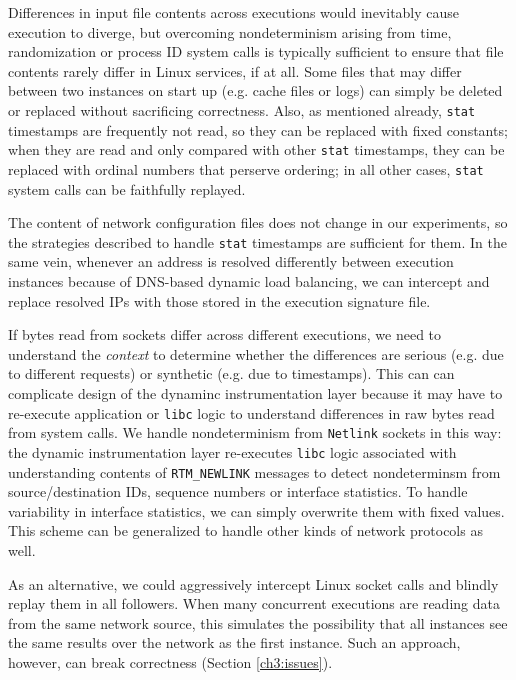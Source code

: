  \newline
Differences in input file contents across
executions would inevitably cause execution
to diverge, but overcoming nondeterminism arising
from time, randomization or process ID system calls
is typically sufficient to ensure that
file contents rarely differ in Linux services,
if at all. Some files that may differ
between two instances on start up (e.g. 
cache files or logs) can simply be 
deleted or replaced without sacrificing correctness.
Also, as mentioned already, \texttt{stat} 
timestamps are frequently not read, so
they can be replaced with fixed constants;
when they are read and only compared with other
\texttt{stat} timestamps, they can be replaced with 
ordinal numbers that perserve ordering;  
in all other cases, \texttt{stat} system calls 
can be faithfully replayed. \newline

 \newline
The content of network configuration files
does not change in our experiments, so the strategies 
described to handle \texttt{stat} timestamps 
are sufficient for them. In the same vein, whenever an address is resolved
differently between execution instances because of DNS-based dynamic load balancing, 
we can intercept and replace resolved IPs with those
stored in the execution signature file.

If bytes read from sockets differ across different executions,
we need to understand the {\em context} to determine whether the
differences are serious (e.g. due to different requests)
or synthetic (e.g. due to timestamps). This can
can complicate design of the dynaminc instrumentation
layer because it 
may have to re-execute application or \texttt{libc}
logic to understand differences in raw bytes read from system calls.
We handle nondeterminism from \texttt{Netlink}
sockets in this way: the dynamic instrumentation layer 
re-executes \texttt{libc} logic associated
with understanding contents of \texttt{RTM\_NEWLINK}
messages to detect nondeterminsm from source/destination 
IDs, sequence numbers or interface statistics.
To handle variability in interface statistics,
we can simply overwrite them with fixed values.
This scheme can be generalized to handle
other kinds of network protocols as well.

As an alternative, we could
aggressively intercept Linux socket calls
and blindly replay them in all followers.
When many concurrent executions are reading data from the
same network source, this simulates the possibility
that all instances see the same results over the network
as the first instance. Such an approach, however,
can break correctness (Section \ref{ch3:issues}).
          
